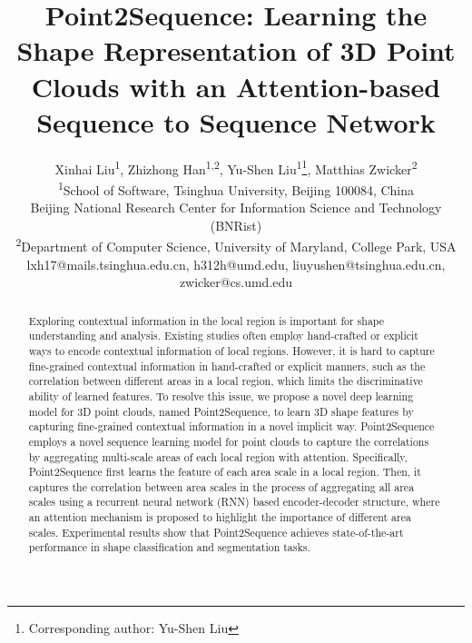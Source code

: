 \documentclass[letterpaper]{article}
\begin{document}
\title{Point2Sequence: Learning the Shape Representation of 3D Point Clouds with an Attention-based Sequence to Sequence Network}
\author{
Xinhai Liu\textsuperscript{1}, Zhizhong Han\textsuperscript{1,2}, Yu-Shen Liu\textsuperscript{1}\thanks{Corresponding author: Yu-Shen Liu}, Matthias Zwicker\textsuperscript{2}\\
\textsuperscript{1}School of Software, Tsinghua University, Beijing 100084, China \\
Beijing National Research Center for Information Science and Technology (BNRist)\\
\textsuperscript{2}Department of Computer Science, University of Maryland, College Park, USA\\
lxh17@mails.tsinghua.edu.cn, 
h312h@umd.edu, 
liuyushen@tsinghua.edu.cn, 
zwicker@cs.umd.edu
}
\maketitle
\begin{abstract}






Exploring contextual information in the local region is important for shape understanding and analysis.
Existing studies often employ hand-crafted or explicit ways to encode contextual information of local regions. However, it is hard to capture fine-grained contextual information in hand-crafted or explicit manners, such as the correlation between different areas in a local region, which limits the discriminative ability of learned features. To resolve this issue, we propose a novel deep learning model for 3D point clouds, named Point2Sequence, to learn 3D shape features by capturing fine-grained contextual information in a novel implicit way. Point2Sequence employs a novel sequence learning model for point clouds to capture the correlations by aggregating multi-scale areas of each local region with attention. Specifically, Point2Sequence first learns the feature of each area scale in a local region. Then, it captures the correlation between area scales in the process of aggregating all area scales using a recurrent neural network (RNN) based encoder-decoder structure, where an attention mechanism is proposed to highlight the importance of different area scales. Experimental results show that Point2Sequence achieves state-of-the-art performance in shape classification and segmentation tasks.

\end{abstract}
\end{document}
